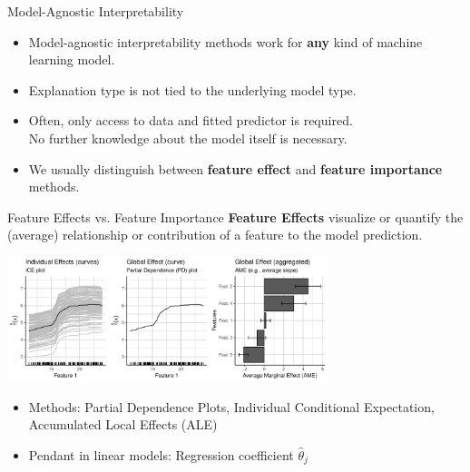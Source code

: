 \documentclass[aspectratio=169]{../latex_main/tntbeamer}  %
\begin{document}
\begin{frame}[c]{Model-Agnostic Interpretability}
	\begin{itemize}
		\itemsep2em
		\item Model-agnostic interpretability methods work for \textbf{any} kind of machine learning model.
		\item Explanation type is not tied to the underlying model type.
		\item Often, only access to data and fitted predictor is required.\\
		 No further knowledge about the model itself is necessary.
		\item We usually distinguish between \textbf{feature effect} and \textbf{feature importance} methods.
	\end{itemize}
\end{frame}


\begin{frame}[c]{Feature Effects vs. Feature Importance}
	\vspace{-1em}
	\textbf{Feature Effects} visualize or quantify the (average) relationship or contribution of a feature to the model prediction.
	\begin{center}
		\includegraphics[page=1, width=0.7\textwidth]{figure/feature-effects}
	\end{center}
	\begin{itemize}
		\item Methods: Partial Dependence Plots, Individual Conditional Expectation,\\ Accumulated Local Effects (ALE)
		\item Pendant in linear models: Regression coefficient $\hat{\theta}_j$
	\end{itemize}
\end{frame}
\end{document}
